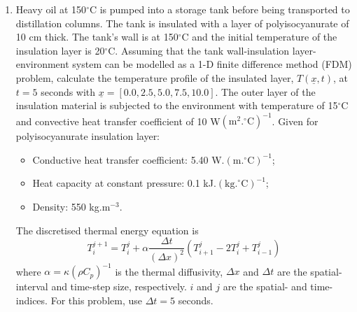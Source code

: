 \documentclass[calculator,datasheet,handbook,solutions]{exam}
\begin{document}
\begin{question}
\begin{enumerate}
  \item Heavy oil at 150$^{\circ}$C is pumped into a storage tank before being transported to distillation columns. The tank is insulated with a layer of polyisocyanurate of 10 cm thick. The tank's wall is at 150$^{\circ}$C and the initial temperature of the insulation layer is 20$^{\circ}$C. Assuming that the tank wall-insulation layer-environment system can be modelled as a 1-D finite difference method (FDM) problem,  calculate the temperature profile of the insulated layer, $T\left(\underline{x},t\right)$, at $t = 5$ seconds with $\underline{x}=\left[0.0, 2.5, 5.0, 7.5, 10.0\right]$. The outer layer of the insulation material is subjected to the environment with temperature of 15$^{\circ}$C and convective heat transfer coefficient of 10 W$\left(\text{m}^{2}.^{\circ}\text{C}\right)^{-1}$. Given for polyisocyanurate insulation layer:
    \begin{itemize}
      \item Conductive heat transfer coefficient: 5.40 W.$\left(\text{m.}^{\circ}\text{C}\right)^{-1}$;
      \item Heat capacity at constant pressure: 0.1 kJ.$\left(\text{kg.}^{\circ}\text{C}\right)^{-1}$;
      \item Density: 550 kg.m$^{-3}$.
    \end{itemize}
    The discretised thermal energy equation is
\begin{displaymath}
    T_{i}^{j+1} = T_{i}^{j} + \alpha\frac{\Delta t}{\left(\Delta x\right)^{2}}\left(T_{i+1}^{j}-2T_{i}^{j}+T_{i-1}^{j}\right)
\end{displaymath}
where $\alpha=\kappa\left(\rho C_{p}\right)^{-1}$ is the thermal diffusivity, $\Delta x$ and $\Delta t$ are the spatial-interval and time-step size, respectively. $i$ and $j$ are the spatial- and time-indices. For this problem, use $\Delta t = 5$ seconds.~
\end{enumerate}
\end{question}
\end{document}
